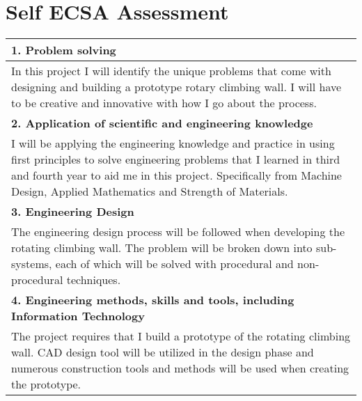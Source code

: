\chapter{Self ECSA Assessment}

{\small
{}
\noindent
\begin{longtable}{|p{\dimexpr \linewidth-2\tabcolsep-2\arrayrulewidth}|}
\hline
\textbf{1. Problem solving}%
\\
\hline
 In this project I will identify the unique problems that come with designing and building a prototype rotary climbing wall. I will have to be creative and innovative with how I go about the process.
 \\[1ex]
\hline
\textbf{2. Application of scientific and engineering knowledge}%
\\
\hline
I will be applying the engineering knowledge and practice in using first principles to solve engineering problems that I learned in third and fourth year to aid me in this project. Specifically from Machine Design, Applied Mathematics and Strength of Materials.
\\[1ex]

\hline
\textbf{3. Engineering Design}%
\\
\hline
The engineering design process will be followed when developing the rotating climbing wall. The problem will be broken down into sub-systems, each of which will be solved with procedural and non-procedural techniques.
\\[1ex]

\hline
\textbf{4. Engineering methods, skills and tools, including Information Technology}%
\\
\hline
The project requires that I build a prototype of the rotating climbing wall. CAD design tool will be utilized in the design phase and numerous construction tools and methods will be used when creating the prototype.
\\[1ex]


\end{longtable}}
